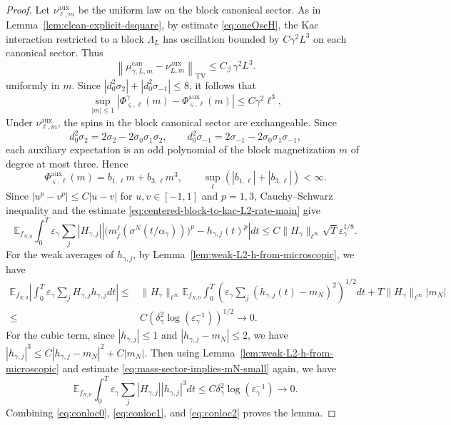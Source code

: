 \documentclass{article}
\begin{document}
\begin{proof}
Let \(\nu_{\ell,m}^{\mathrm{aux}}\) be the uniform law on the block canonical
sector.  
As in Lemma~\ref{lem:clean-explicit-dsquare}, by estimate \eqref{eq:oneOscH}, the Kac interaction restricted to a block $\Lambda_L$ has oscillation bounded by \(C\gamma^2L^3\) on each canonical sector. Thus
\[
\left\|
\mu_{\gamma,L,m}^{\mathrm{can}}-\nu_{L,m}^{\mathrm{aux}}
\right\|_{\mathrm{TV}}
\le
C_\beta\,\gamma^2L^3.
\]
uniformly in $m$.
Since $|d_0^2\sigma_2|+|d_0^2\sigma_{-1}| \le 8$, it follows that
\[
\sup_{|m|\le1}
\left|
\Phi_{\varsigma,\ell}^{\gamma}(m)
-\Phi_{\varsigma,\ell}^{\mathrm{aux}}(m)
\right|
\le C\gamma^2\ell^3,
\]
Under \(\nu_{\ell,m}^{\mathrm{aux}}\), the spins in the block canonical sector are exchangeable. Since
\[
d_0^2\sigma_2=2\sigma_2-2\sigma_0\sigma_1\sigma_2,
\qquad
d_0^2\sigma_{-1}=2\sigma_{-1}-2\sigma_0\sigma_1\sigma_{-1},
\]
each auxiliary expectation is an odd polynomial of the block magnetization
\(m\) of degree at most three.  Hence
\[
\Phi_{\varsigma,\ell}^{\mathrm{aux}}(m)
=b_{1,\ell}m+b_{3,\ell}m^3,
\qquad
\sup_\ell(|b_{1,\ell}|+|b_{3,\ell}|)<\infty .
\]
Since \(|u^p-v^p|\le C|u-v|\) for \(u,v\in[-1,1]\) and \(p=1,3\), Cauchy--Schwarz inequality and the  estimate \eqref{eq:centered-block-to-kac-L2-rate-main} give
\begin{equation}\label{eq:conloc0}
    \mathbb E_{f_{N,0}}\int_0^T \varepsilon_\gamma\sum_j
|H_{\gamma,j}|
\left| \bigl(m_j^\ell(\sigma^N(t/\alpha_\gamma))\bigr)^p -h_{\gamma,j}(t)^p
\right|dt \le C\|H_\gamma\|_{\ell^\infty}
\sqrt{T} \varepsilon^{1/8}_{\gamma}.
\end{equation}
For the weak averages of \(h_{\gamma,j}\), by Lemma~\ref{lem:weak-L2-h-from-microscopic}, we have
\begin{align}\label{eq:conloc1}
\mathbb E_{f_{N,0}}
\left|\int_0^T\varepsilon_\gamma\sum_jH_{\gamma,j}h_{\gamma,j}dt\right|
\le & \|H_\gamma\|_{\ell^\infty}
\mathbb E_{f_{N,0}}
\int_0^T \left(\varepsilon_\gamma\sum_j(h_{\gamma,j}(t)-m_N)^2\right)^{1/2}dt
+T\|H_\gamma\|_{\ell^\infty}|m_N| \nonumber \\
\le & C\left( \delta_\gamma^2\log(\varepsilon_\gamma^{-1}) \right)^{1/2} 
\rightarrow0.
\end{align}
For the cubic term, since \(|h_{\gamma,j}|\le1\) and
\(|h_{\gamma,j}-m_N|\le2\), we have
\(
|h_{\gamma,j}|^3
\le
C|h_{\gamma,j}-m_N|^2+C|m_N|.
\)
Then using Lemma~\ref{lem:weak-L2-h-from-microscopic} and estimate \eqref{eq:mass-sector-implies-mN-small} again, we have
\begin{equation}\label{eq:conloc2}
    \mathbb E_{f_{N,0}}
\int_0^T\varepsilon_\gamma\sum_j|H_{\gamma,j}||h_{\gamma,j}|^3dt
\le
C \delta_\gamma^2\log(\varepsilon_\gamma^{-1})\rightarrow0.
\end{equation}
Combining \eqref{eq:conloc0}, \eqref{eq:conloc1}, and \eqref{eq:conloc2} proves the lemma.
\end{proof}
\end{document}
